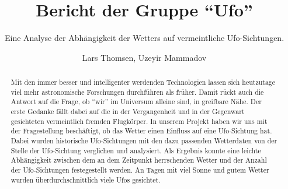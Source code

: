\title{Bericht der Gruppe \enquote{Ufo}}
\subtitle{Eine Analyse der Abhängigkeit der Wetters auf vermeintliche Ufo-Sichtungen.}         %


\author{Lars Thomsen, Uzeyir Mammadov}

\begin{abstract}
    Mit den immer besser und intelligenter werdenden Technologien lassen sich heutzutage viel mehr astronomische Forschungen durchführen als früher. Damit rückt auch die Antwort auf die Frage, ob \enquote{wir} im Universum alleine sind, in greifbare Nähe. Der erste Gedanke fällt dabei auf die in der Vergangenheit und in der Gegenwart gesichteten vermeintlich fremden Flugkörper. In unserem Projekt haben wir uns mit der Fragestellung beschäftigt, ob das Wetter einen Einfluss auf eine Ufo-Sichtung hat. Dabei wurden historische Ufo-Sichtungen mit den dazu passenden Wetterdaten von der Stelle der Ufo-Sichtung verglichen und analysiert. Als Ergebnis konnte eine leichte Abhängigkeit zwischen dem an dem Zeitpunkt herrschenden Wetter und der Anzahl der Ufo-Sichtungen festegestellt werden. An Tagen mit viel Sonne und gutem Wetter wurden überdurchschnittlich viele Ufos gesichtet.

\end{abstract}

\maketitle
